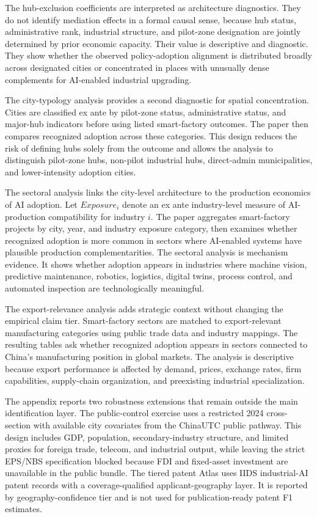 The hub-exclusion coefficients are interpreted as architecture diagnostics. They do not identify mediation effects in a formal causal sense, because hub status, administrative rank, industrial structure, and pilot-zone designation are jointly determined by prior economic capacity. Their value is descriptive and diagnostic. They show whether the observed policy-adoption alignment is distributed broadly across designated cities or concentrated in places with unusually dense complements for AI-enabled industrial upgrading.

The city-typology analysis provides a second diagnostic for spatial concentration. Cities are classified ex ante by pilot-zone status, administrative status, and major-hub indicators before using listed smart-factory outcomes. The paper then compares recognized adoption across these categories. This design reduces the risk of defining hubs solely from the outcome and allows the analysis to distinguish pilot-zone hubs, non-pilot industrial hubs, direct-admin municipalities, and lower-intensity adoption cities.

The sectoral analysis links the city-level architecture to the production economics of AI adoption. Let $Exposure_i$ denote an ex ante industry-level measure of AI-production compatibility for industry $i$. The paper aggregates smart-factory projects by city, year, and industry exposure category, then examines whether recognized adoption is more common in sectors where AI-enabled systems have plausible production complementarities. The sectoral analysis is mechanism evidence. It shows whether adoption appears in industries where machine vision, predictive maintenance, robotics, logistics, digital twins, process control, and automated inspection are technologically meaningful.

The export-relevance analysis adds strategic context without changing the empirical claim tier. Smart-factory sectors are matched to export-relevant manufacturing categories using public trade data and industry mappings. The resulting tables ask whether recognized adoption appears in sectors connected to China’s manufacturing position in global markets. The analysis is descriptive because export performance is affected by demand, prices, exchange rates, firm capabilities, supply-chain organization, and preexisting industrial specialization.

The appendix reports two robustness extensions that remain outside the main identification layer. The public-control exercise uses a restricted 2024 cross-section with available city covariates from the ChinaUTC public pathway. This design includes GDP, population, secondary-industry structure, and limited proxies for foreign trade, telecom, and industrial output, while leaving the strict EPS/NBS specification blocked because FDI and fixed-asset investment are unavailable in the public bundle. The tiered patent Atlas uses IIDS industrial-AI patent records with a coverage-qualified applicant-geography layer. It is reported by geography-confidence tier and is not used for publication-ready patent F1 estimates.

